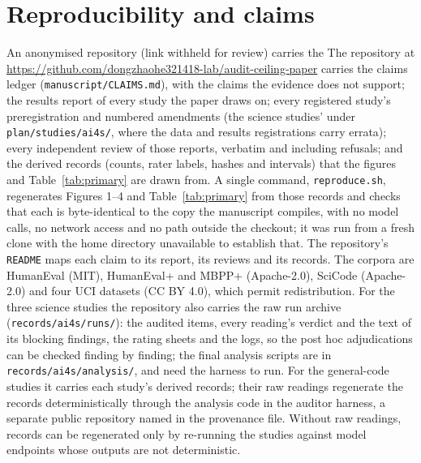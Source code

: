 \section{Reproducibility and claims}
\label{sec:repro}
\ifdefined\ANON An anonymised repository (link withheld for review) carries the{} \else
The repository at \url{https://github.com/dongzhaohe321418-lab/audit-ceiling-paper} carries the{} \fi
claims ledger (\texttt{manuscript/CLAIMS.md}), with the claims the evidence does not support; the results
report of every study the paper draws on; every registered study's preregistration and numbered
amendments (the science studies' under \texttt{plan/studies/ai4s/}, where the data and results
registrations carry errata); every independent review of those reports, verbatim and including
refusals; and the derived records (counts, rater labels, hashes and intervals) that the figures
and Table~\ref{tab:primary} are drawn from. A single command, \texttt{reproduce.sh},
regenerates Figures 1--4 and Table~\ref{tab:primary} from those records and checks that each
is byte-identical to the copy the manuscript compiles, with no model calls, no network access and no path outside the checkout; it was run from
a fresh clone with the home directory unavailable to establish that. The
repository's \texttt{README} maps each claim to its report, its reviews and its records. The
corpora are HumanEval (MIT), HumanEval+ and MBPP+ (Apache-2.0), SciCode (Apache-2.0) and four UCI
datasets (CC BY 4.0), which permit redistribution. For the three science studies the repository also carries the raw run archive (\texttt{records/ai4s/runs/}): the audited items, every reading's verdict and the text of its blocking findings, the rating sheets and the logs, so the post hoc adjudications can be checked finding by finding; the final analysis scripts are in \texttt{records/ai4s/analysis/}, and need the harness to run. For the general-code studies it carries each study's derived records; their raw readings regenerate the records deterministically through the analysis code in the auditor harness, a separate public repository named in the provenance file. Without raw readings, records can be regenerated only by re-running the studies against model endpoints whose outputs are not deterministic.

